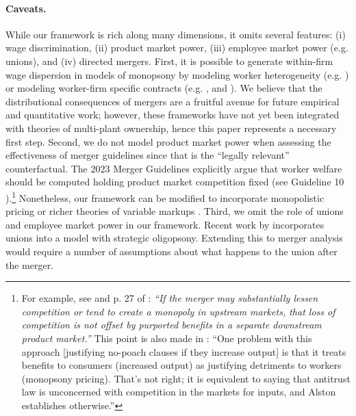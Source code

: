 \documentclass[12pt]{article}
\theoremstyle{prop}
\begin{document}
\paragraph{Caveats.} 
While our framework is rich along many dimensions, it omits several features: (i) wage discrimination, (ii)   product market power, (iii) employee market power (e.g. unions), and (iv) directed mergers.
First, it is possible to generate within-firm wage dispersion in models of monopsony by modeling worker heterogeneity (e.g. \citet{berger2022minimum}) or modeling worker-firm specific contracts (e.g. \citet{bagga2023firm}, \citet{berger2023anatomy} and \citet{jungerman2023dynamic}). 
We believe that the  distributional consequences of mergers are a fruitful avenue for future empirical and quantitative work; however, these frameworks have not yet been integrated with theories of multi-plant ownership, hence this paper represents a necessary first step. 
Second, we do not model product market power when assessing the effectiveness of merger guidelines since that is the ``legally relevant'' counterfactual. 
The 2023 Merger Guidelines explicitly argue that worker welfare should be computed holding product market competition fixed  (see Guideline 10 \citet{doj2023final}).\footnote{
    For example, see \citet{hemphill2018mergers} and p. 27 of  \citet{doj2023final}: \emph{``If the merger may substantially lessen competition or tend to create a monopoly in upstream
	markets, that loss of competition is not offset by purported benefits in a separate downstream product
	market.''}
This point is also made in \citet{deslandes2023}: ``One problem with this approach [justifying no-poach clauses if they increase output] is that it treats benefits to consumers (increased output) as justifying detriments to workers (monopsony pricing). That's not right; it is equivalent to saying that antitrust law is unconcerned with competition in the markets for inputs, and Alston establishes otherwise.'' } 
Nonetheless, our framework can be modified to incorporate monopolistic pricing or richer theories of variable markups  \citep[see][for~such~a~modification~of~our~framework~which~we~discuss~in~Appendix~\ref{app:product_market}]{deb2022drives}.
Third, we omit the role of unions and employee market power in our framework. 
Recent work by \citet{azkarate2020aggregate} incorporates unions into a model with strategic oligopsony. 
Extending this to merger analysis would require a number of assumptions about what happens to the union after the merger. 
\end{document}
